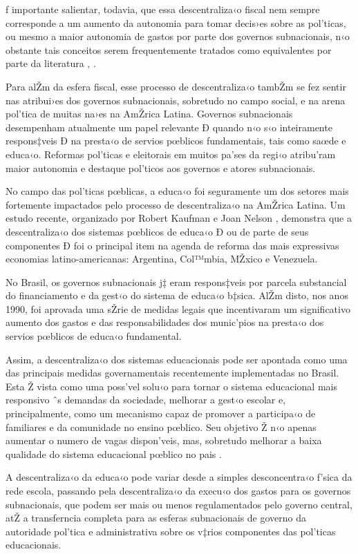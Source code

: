 \documentclass[a4paper, 12pt]{article}
\begin{document}
ƒ importante salientar, todavia, que essa descentraliza‹o fiscal nem sempre corresponde a um aumento da autonomia para tomar decis›es sobre as pol’ticas, ou mesmo a  maior autonomia de gastos por parte dos governos subnacionais, n‹o obstante tais conceitos serem frequentemente tratados como equivalentes por parte da literatura \cite{rodden_comparative_2004}, \cite{falleti_sequential_2005}.

Para alŽm da esfera fiscal, esse processo de descentraliza‹o tambŽm se fez sentir nas atribui›es dos governos subnacionais, sobretudo no campo social, e na arena pol’tica de muitas na›es na AmŽrica Latina. Governos subnacionais desempenham atualmente um papel relevante Ð quando n‹o s‹o inteiramente respons‡veis Ð na presta‹o de servios pœblicos fundamentais, tais como saœde e educa‹o. Reformas pol’ticas e eleitorais em muitos pa’ses da regi‹o atribu’ram maior autonomia e destaque pol’ticos aos governos e atores subnacionais.

No campo das pol’ticas pœblicas, a educa‹o foi seguramente um dos setores mais fortemente impactados pelo processo de descentraliza‹o na AmŽrica Latina. Um estudo recente, organizado por Robert Kaufman e Joan Nelson \citeyear{kaufman_crucial_2004}, demonstra que a descentraliza‹o dos sistemas pœblicos de educa‹o Ð ou de parte de seus componentes Ð foi o principal item na agenda de reforma das mais expressivas economias latino-americanas: Argentina, Col™mbia, MŽxico e Venezuela. 

No Brasil,  os governos subnacionais j‡ eram respons‡veis por parcela substancial do financiamento e da gest‹o do sistema de educa‹o b‡sica. AlŽm disto, nos anos 1990, foi aprovada uma sŽrie de medidas legais que incentivaram um significativo aumento dos gastos e das responsabilidades dos munic’pios na presta‹o dos servios pœblicos de educa‹o fundamental. 

Assim, a  descentraliza‹o dos sistemas educacionais pode ser apontada como uma das principais medidas governamentais recentemente implementadas no Brasil.  Esta Ž vista como uma poss’vel solu‹o para tornar o sistema educacional mais responsivo ˆs demandas da sociedade, melhorar a gest‹o escolar e, principalmente, como um mecanismo capaz de promover a participa‹o de familiares e da comunidade no ensino pœblico.  Seu objetivo Ž n‹o apenas aumentar o numero de vagas dispon’veis, mas, sobretudo melhorar a baixa qualidade do sistema educacional pœblico no pais \cite{souza_revolucao_2005}.

A descentraliza‹o da educa‹o pode variar desde a simples desconcentra‹o f’sica da rede escola, passando pela descentraliza‹o da execu‹o dos gastos para os governos subnacionais, que podem ser mais ou menos regulamentados pelo governo central,  atŽ a transferncia completa para as esferas subnacionais de governo da autoridade pol’tica e administrativa sobre os v‡rios componentes das pol’ticas educacionais.
\end{document}
